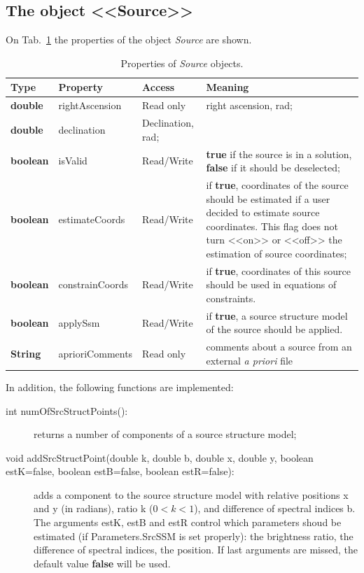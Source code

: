 \documentclass [10pt,letterpaper]{report}
\begin{document}
{{%
\subsection{The object <<Source>>}
\label{section-scripting-session-source}
On Tab.~\ref{tab-scr-session-sources} the properties of the object {\sl Source}
are shown.

\begin{table}[htb]
\centering
\footnotesize
\begin{tabular}{lllp{}}
\hline
Type & Property & Access & Meaning\\
\hline
  {\bf double}  & rightAscension  & Read only & right ascension, rad;\\
  {\bf double}  & declination     & Declination, rad;\\
  {\bf boolean} & isValid         & Read/Write& {\bf true} if the source is in a solution, {\bf false} if it should be deselected;\\
  {\bf boolean} & estimateCoords  & Read/Write& if {\bf true}, coordinates of the source should be estimated if a user decided
                                    to estimate source coordinates. This flag does not turn <<on>> or <<off>> the estimation of
                                    source coordinates;\\
  {\bf boolean} & constrainCoords & Read/Write& if {\bf true}, coordinates of this source should be used in equations of
                                    constraints.\\
  {\bf boolean} & applySsm        & Read/Write& if {\bf true}, a source structure model of the source should be applied.\\
  {\bf String}  & aprioriComments & Read only & comments about a source from an external {\it a priori} file\\
\hline
\end{tabular}
\caption{Properties of {\sl Source} objects.}
\label{tab-scr-session-sources}
\end{table}

\noindent
In addition, the following functions are implemented:
\begin{description}
\item[int numOfSrcStructPoints():] returns a number of components of a source structure model;

\item[void addSrcStructPoint(double k, double b, double x, double y, boolean estK=false, boolean estB=false, boolean estR=false):]
   adds a component to the source
   structure model with relative positions x and y (in radians), ratio k ($0<k<1$), and difference of spectral
   indices b. The arguments estK, estB and estR control which parameters shoud be estimated (if
   Parameters.SrcSSM is set properly): the brightness ratio, the difference of spectral indices, the position.
   If last arguments are missed, the default value {\bf false} will be used.


\end{description}}}
\end{document}
